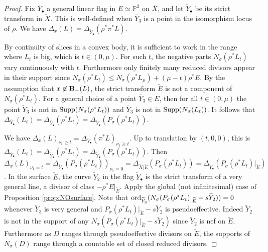 \documentclass[12pt]{amsart}
\theoremstyle{definition}
\newcommand{\bb}{\ensuremath{\mathfrak{b}}}
\renewcommand{\geq}{\geqslant}
\renewcommand{\leq}{\leqslant}
\newcommand{\?}{ \circled{{\large\bf ?}}}
\let\bb\mathbb
\begin{document}
\begin{proof}
	Fix $\overline Y_{\bullet}$ a general linear flag in $E\simeq\bb P^{2}$ on $\overline X$, and let $\widetilde Y_{\bullet}$ be its strict transform in $\widetilde X$. This is well-defined when $\overline Y_3$ is a point in the isomorphism locus of $\rho$. We have $\Delta_x(L)=\Delta_{\widetilde Y_{\bullet}}(\rho^*\pi^*L)$.
	
	By continuity of slices in a convex body, it is sufficient to work in the range where $L_t$ is big, which is $t\in(0,\mu)$. For such $t$, the negative parts $N_{\sigma}(\rho^*L_t)$ vary continuously with $t$. Furthermore only finitely many reduced divisors appear in their support since $N_{\sigma}(\rho^*L_t)\leq N_{\sigma}(\rho^*L_{\mu})+(\mu-t)\rho^*E$. By the assumption that $x\not\in{\bf B}_-(L)$, the strict transform $\widetilde E$ is not a component of $N_{\sigma}(\rho^*L_t)$. For a general choice of a point $\overline Y_3\in E$, then for all $t\in(0,\mu)$ the point $\widetilde Y_3$ is not in ${\rm Supp}(N_{\sigma}(\rho^*L_t))$ and $\overline Y_3$ is not in ${\rm Supp}(N_{\sigma}(L_t))$. It follows that $\Delta_{\overline Y_{\bullet}}(L_t)=\Delta_{\widetilde Y_{\bullet}}(\rho^*L_t)=\Delta_{\widetilde Y_{\bullet}}(P_{\sigma}(\rho^*L_t))$.
	
	We have $\Delta_x(L)_{\nu_1\geq t}=\Delta_{\overline Y_{\bullet}}(\pi^*L)_{\nu_1\geq t}$. Up to translation by $(t,0,0)$, this is $\Delta_{\overline Y_{\bullet}}(L_t)=\Delta_{\widetilde Y_{\bullet}}(\rho^*L_t)=\Delta_{\widetilde Y_{\bullet}}(P_{\sigma}(\rho^*L_t))$. Then $\Delta_x(L)_{\nu_1=t}=\Delta_{\widetilde Y_{\bullet}}(P_{\sigma}(\rho^*L_t))_{\nu_1=0}=\Delta_{\widetilde X|\widetilde E}(P_{\sigma}(\rho^*L_t))=\Delta_{\widetilde Y_{\bullet}}(P_{\sigma}(\rho^*L_t)|_{\widetilde E})$. In the surface $\widetilde E$, the curve $\widetilde Y_2$ in the flag $\widetilde Y_{\bullet}$ is the strict transform of a very general line, a divisor of class $-\rho^*E|_{\widetilde E}$. Apply the global (not infinitesimal) case of Proposition \ref{prop:NOsurface}. Note that ${\rm ord}_{\widetilde Y_3}(N_{\sigma}(P_{\sigma}(\rho^*L_t)|_{\widetilde E}-s\widetilde Y_2))=0$ whenever $\widetilde Y_3$ is very general and $P_{\sigma}(\rho^*L_t)|_{\widetilde E}-s\widetilde Y_2$ is pseudoeffective. Indeed $\widetilde Y_2$ is not in the support of any $N_{\sigma}(P_{\sigma}(\rho^*L_t)|_{\widetilde E}-s\widetilde Y_2)$ since $\widetilde Y_2$ is nef on $\widetilde E$. Furthermore as $D$ ranges through pseudoeffective divisors on $\widetilde E$, the supports of $N_{\sigma}(D)$ range through a countable set of closed reduced divisors.
\end{proof}
\end{document}
